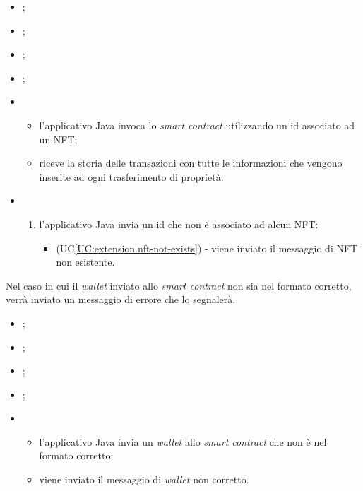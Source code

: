 \begin{itemize}
  \item {};
  \item {};
  \item {};
  \item {};

  \item \UCMain
  \begin{itemize}
    \item l'applicativo Java invoca lo \textit{smart contract} utilizzando un id associato ad un NFT;
    \item riceve la storia delle transazioni con tutte le informazioni che vengono inserite ad ogni trasferimento di proprietà.
  \end{itemize}
  
  \item \UCExt
  \begin{enumerate}[label=\lett]
    \item l'applicativo Java invia un id che non è associato ad alcun NFT:
    \begin{itemize}
      \item (UC\ref{UC:extension.nft-not-exists}) - viene inviato il messaggio di NFT non esistente.
    \end{itemize}
  \end{enumerate}
\end{itemize}

\label{UC:extension.wallet-not-correct}

Nel caso in cui il \textit{wallet} inviato allo \textit{smart contract} non sia nel formato corretto, verrà inviato un messaggio di errore che lo segnalerà.

\begin{itemize}
  \item {};
  \item {};
  \item {};
  \item {};
  
  \item \UCMain
  \begin{itemize}
    \item l'applicativo Java invia un \textit{wallet} allo \textit{smart contract} che non è nel formato corretto;
    \item viene inviato il messaggio di \textit{wallet} non corretto.
  \end{itemize}
\end{itemize}

